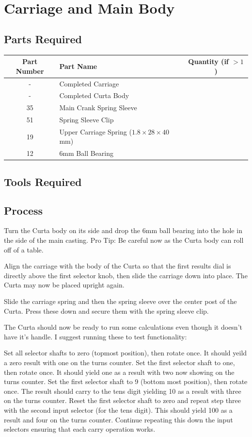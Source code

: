 \documentclass[openany]{book}
\begin{document}
\chapter{Carriage and Main Body}
\section{Parts Required}

\begin{table}[!ht]
	\centering
	\begin{tabular}{clc}
		Part Number & Part Name & Quantity (if $>1$) \\ \hline
		 - & Completed Carriage & \\
		 - & Completed Curta Body & \\
		 35 & Main Crank Spring Sleeve & \\
		 51 & Spring Sleeve Clip & \\ \hline \hline
		 19 & Upper Carriage Spring ($1.8\times28\times40$mm) & \\
		 12 & 6mm Ball Bearing & 
	\end{tabular}
\end{table}


\section{Tools Required}

\section{Process}
Turn the Curta body on its side and drop the 6mm ball bearing into the hole in the side of the main casting. Pro Tip: Be careful now as the Curta body can roll off of a table.

Align the carriage with the body of the Curta so that the first results dial is directly above the first selector knob, then slide the carriage down into place. The Curta may now be placed upright again.

Slide the carriage spring and then the spring sleeve over the center post of the Curta. Press these down and secure them with the spring sleeve clip.

The Curta should now be ready to run some calculations even though it doesn't have it's handle. I suggest running these to test functionality:

Set all selector shafts to zero (topmost position), then rotate once. It should yeild a zero result with one on the turns counter.
Set the first selector shaft to one, then rotate once. It should yield one as a result with two now showing on the turns counter.
Set the first selector shaft to 9 (bottom most position), then rotate once. The result should carry to the tens digit yielding 10 as a result with three on the turns counter.
Reset the first selector shaft to zero and repeat step three with the second input selector (for the tens digit). This should yield 100 as a result and four on the turns counter.
Continue repeating this down the input selectors ensuring that each carry operation works.
\end{document}
